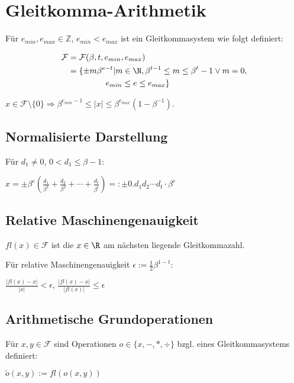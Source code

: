 \section*{Gleitkomma-Arithmetik}

Für $e_{min}, e_{max} \in \mathbb{Z}$, $e_{min} < e_{max}$ ist ein Gleitkommasystem wie folgt definiert:

\vspace*{-4mm}
\begin{align*}
\mathcal{F} &= \mathcal{F}(\beta,t,e_{min},e_{max}) \\
            &= \{ \pm m \beta^{e-t} | m \in \N, \beta^{t-1} \leq m \leq \beta^t - 1 \lor m = 0, \\ & \hspace*{16mm}e_{min} \leq e \leq e_{max} \}
\end{align*}

$x \in \mathcal{F} \setminus \{0\} \Rightarrow \beta^{e_{min}-1} \leq |x| \leq \beta^{e_{max}}(1-\beta^{-1})$.

\subsection*{Normalisierte Darstellung}

Für $d_1 \neq 0$, $0 < d_1 \leq \beta - 1$:

$x=\pm \beta^e ( \frac{d_1}{\beta^1} + \frac{d_2}{\beta^2} + \cdots + \frac{d_t}{\beta^t} ) =: \pm 0.d_1 d_2 \cdots d_t \cdot \beta^e$

\subsection*{Relative Maschinengenauigkeit}

$fl(x) \in \mathcal{F}$ ist die $x \in \R$ am nächsten liegende Gleitkommazahl.

Für relative Maschinengenauigkeit $\epsilon := \frac{1}{2} \beta^{1-t}$:

$\frac{|fl(x)-x|}{|x|} < \epsilon$, $\frac{|fl(x)-x|}{|fl(x)|} \leq \epsilon$

\subsection*{Arithmetische Grundoperationen}

Für $x, y \in \mathcal{F}$ sind Operationen $o \in \{x,-,*,\div\}$ bzgl. eines Gleitkommasystems definiert:

$\tilde o(x,y) := fl(o(x,y))$

